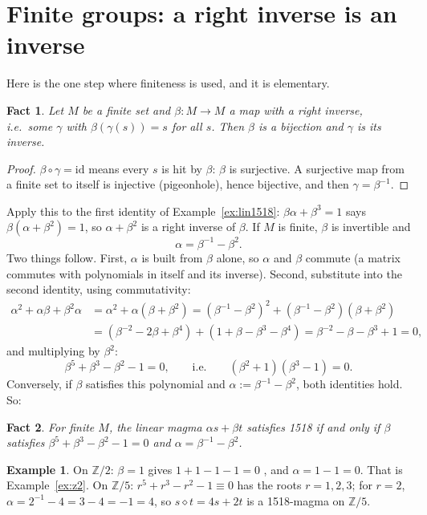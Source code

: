 \documentclass[11pt]{article}
\newtheorem{fact}{Fact}
\theoremstyle{definition}\newtheorem{example}{Example}\newtheorem{exercise}{Exercise}
\theoremstyle{remark}\newtheorem*{remark}{Remark}
\newcommand{\op}{\diamond}
\newcommand{\Z}{\mathbb{Z}}
\begin{document}
\section{Finite groups: a right inverse is an inverse}\label{sec:finite}

Here is the one step where finiteness is used, and it is elementary.

\begin{fact}\label{fact:bij}
Let $M$ be a finite set and $\beta\colon M\to M$ a map with a right inverse, i.e.\ some $\gamma$ with $\beta(\gamma(s))=s$ for all $s$. Then $\beta$ is a bijection and $\gamma$ is its inverse.
\end{fact}
\begin{proof}
$\beta\circ\gamma=\mathrm{id}$ means every $s$ is hit by $\beta$: $\beta$ is surjective. A surjective map from a finite set to itself is injective (pigeonhole), hence bijective, and then $\gamma=\beta^{-1}$.
\end{proof}

Apply this to the first identity of Example~\ref{ex:lin1518}: $\beta\alpha+\beta^3=1$ says $\beta(\alpha+\beta^2)=1$, so $\alpha+\beta^2$ is a right inverse of $\beta$. If $M$ is finite, $\beta$ is invertible and
\[
\alpha = \beta^{-1}-\beta^2 .
\]
Two things follow. First, $\alpha$ is built from $\beta$ alone, so $\alpha$ and $\beta$ commute (a matrix commutes with polynomials in itself and its inverse). Second, substitute into the second identity, using commutativity:
\begin{align*}
\alpha^2+\alpha\beta+\beta^2\alpha &= \alpha^2+\alpha(\beta+\beta^2)
= (\beta^{-1}-\beta^2)^2 + (\beta^{-1}-\beta^2)(\beta+\beta^2)\\
&= (\beta^{-2}-2\beta+\beta^4) + (1+\beta-\beta^3-\beta^4)
= \beta^{-2} - \beta - \beta^{3} + 1 = 0,
\end{align*}
and multiplying by $\beta^2$:
\[
\beta^5+\beta^3-\beta^2-1 = 0, \qquad\text{i.e.}\qquad (\beta^2+1)(\beta^3-1)=0 .
\]
Conversely, if $\beta$ satisfies this polynomial and $\alpha:=\beta^{-1}-\beta^2$, both identities hold. So:

\begin{fact}\label{fact:ring}
For finite $M$, the linear magma $\alpha s+\beta t$ satisfies 1518 if and only if $\beta$ satisfies $\beta^5+\beta^3-\beta^2-1=0$ and $\alpha=\beta^{-1}-\beta^2$.
\end{fact}

\begin{example}
On $\Z/2$: $\beta=1$ gives $1+1-1-1=0$ \checkmark, and $\alpha=1-1=0$. That is Example~\ref{ex:z2}. On $\Z/5$: $r^5+r^3-r^2-1\equiv0$ has the roots $r=1,2,3$; for $r=2$, $\alpha = 2^{-1}-4 = 3-4 = -1 = 4$, so $s\op t = 4s+2t$ is a 1518-magma on $\Z/5$.
\end{example}
\end{document}
